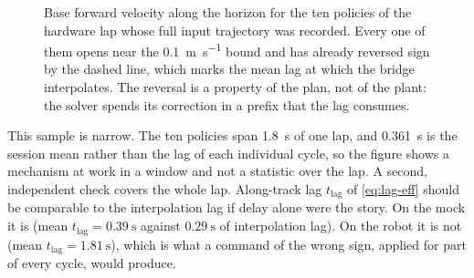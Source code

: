 \begin{figure}[htbp]
  \centering
  \caption[Base command inside one policy against the lag at which it is
    read]{%
    Base forward velocity along the horizon for the ten policies of the
    hardware lap whose full input trajectory was recorded. Every one of
    them opens near the \qty{0.1}{\meter\per\second} bound and has
    already reversed sign by the dashed line, which marks the mean lag
    at which the bridge interpolates. The reversal is a property of the
    plan, not of the plant: the solver spends its correction in a prefix
    that the lag consumes.}
  \label{fig:hw-policy-u}
\end{figure}

This sample is narrow. The ten policies span \qty{1.8}{\second} of one
lap, and \qty{0.361}{\second} is the session mean rather than the lag of
each individual cycle, so the figure shows a mechanism at work in a
window and not a statistic over the lap. A second, independent check
covers the whole lap. Along-track lag $t_{\mathrm{lag}}$ of
\cref{eq:lag-eff} should be comparable to the interpolation lag if delay
alone were the story. On the mock it is (mean
$t_{\mathrm{lag}}=\qty{0.39}{\second}$ against $\qty{0.29}{\second}$ of
interpolation lag). On the robot it is not (mean
$t_{\mathrm{lag}}=\qty{1.81}{\second}$), which is what a command of the
wrong sign, applied for part of every cycle, would produce.

